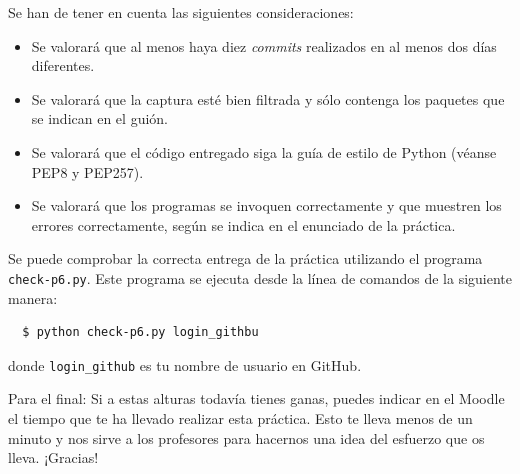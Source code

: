 \documentclass[a4paper,11pt]{article}
\begin{document}
Se han de tener en cuenta las siguientes consideraciones:
\begin{itemize}
  \item Se valorará que al menos haya diez \emph{commits} realizados en al menos dos días diferentes.
  \item Se valorará que la captura esté bien filtrada y sólo contenga los paquetes que se indican en el guión.
  \item Se valorará que el código entregado siga la guía de estilo de Python (véanse PEP8 y PEP257).
  \item Se valorará que los programas se invoquen correctamente y que muestren los errores correctamente, según se indica en el enunciado de la práctica.
\end{itemize}

Se puede comprobar la correcta entrega de la práctica utilizando el programa \texttt{check-p6.py}. Este programa se ejecuta desde la línea de comandos de la siguiente manera:
\begin{verbatim}
  $ python check-p6.py login_githbu
\end{verbatim}


donde \texttt{login\_github} es tu nombre de usuario en GitHub.


\vspace{1cm}

\footnotesize{Para el final: Si a estas alturas todavía tienes ganas, puedes indicar en el Moodle el tiempo que te ha llevado realizar esta práctica. Esto te lleva menos de un minuto y nos sirve a los profesores para hacernos una idea del esfuerzo que os lleva. ¡Gracias!}


%
%
\end{document}
